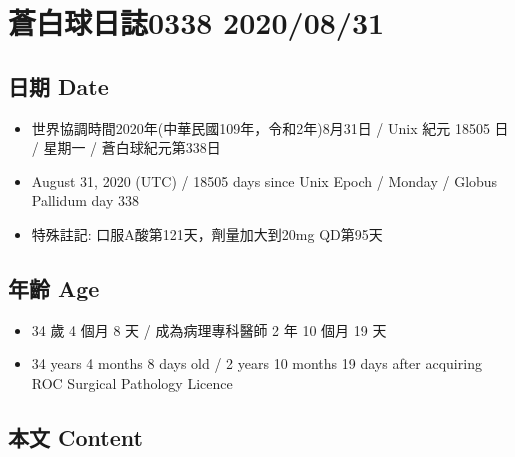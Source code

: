 \documentclass[
]{article}
\providecommand{\tightlist}{%
  \setlength{\itemsep}{0pt}\setlength{\parskip}{0pt}}
\begin{document}
\hypertarget{ux84bcux767dux7403ux65e5ux8a8c0338-20200831}{%
\section{蒼白球日誌0338
2020/08/31}\label{ux84bcux767dux7403ux65e5ux8a8c0338-20200831}}

\hypertarget{ux65e5ux671f-date-30}{%
\subsection{日期 Date}\label{ux65e5ux671f-date-30}}

\begin{itemize}
\tightlist
\item
  世界協調時間2020年(中華民國109年，令和2年)8月31日 / Unix 紀元 18505 日
  / 星期一 / 蒼白球紀元第338日
\item
  August 31, 2020 (UTC) / 18505 days since Unix Epoch / Monday / Globus
  Pallidum day 338
\item
  特殊註記: 口服A酸第121天，劑量加大到20mg QD第95天
\end{itemize}

\hypertarget{ux5e74ux9f61-age-30}{%
\subsection{年齡 Age}\label{ux5e74ux9f61-age-30}}

\begin{itemize}
\tightlist
\item
  34 歲 4 個月 8 天 / 成為病理專科醫師 2 年 10 個月 19 天
\item
  34 years 4 months 8 days old / 2 years 10 months 19 days after
  acquiring ROC Surgical Pathology Licence
\end{itemize}

\hypertarget{ux672cux6587-content-30}{%
\subsection{本文 Content}\label{ux672cux6587-content-30}}
\end{document}
